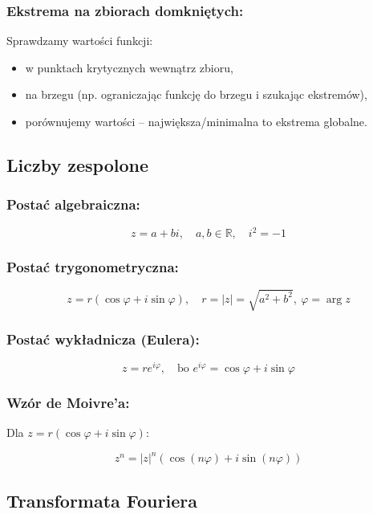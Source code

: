 \subsubsection*{Ekstrema na zbiorach domkniętych:}
Sprawdzamy wartości funkcji:
\begin{itemize}
    \item w punktach krytycznych wewnątrz zbioru,
    \item na brzegu (np. ograniczając funkcję do brzegu i szukając ekstremów),
    \item porównujemy wartości -- największa/minimalna to ekstrema globalne.
\end{itemize}

\subsection{Liczby zespolone}

\subsubsection*{Postać algebraiczna:}

$$
z = a + bi, \quad a, b \in \mathbb{R}, \quad i^2 = -1
$$

\subsubsection*{Postać trygonometryczna:}

$$
z = r(\cos \varphi + i \sin \varphi), \quad r = |z| = \sqrt{a^2 + b^2},\ \varphi = \arg z
$$

\subsubsection*{Postać wykładnicza (Eulera):}

$$
z = re^{i\varphi}, \quad \text{bo } e^{i\varphi} = \cos \varphi + i \sin \varphi
$$

\subsubsection*{Wzór de Moivre'a:}
Dla $z = r\left(\cos \varphi + i \sin \varphi\right)$:

$$
z^n = |z|^n\left(\cos(n\varphi) + i \sin(n\varphi)\right)
$$

\subsection{Transformata Fouriera}

